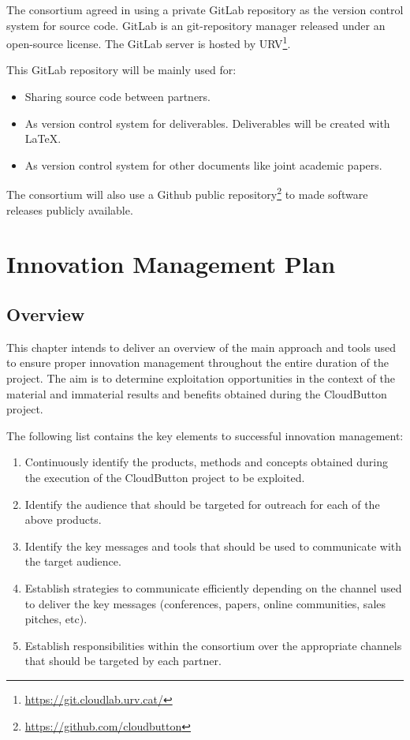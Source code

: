 \documentclass[a4paper,11pt]{article}
\begin{document}
The consortium agreed in using a private GitLab repository as the version control system for source code. GitLab is an git-repository manager released under an open-source license. The GitLab server is hosted by URV\footnote{\url{https://git.cloudlab.urv.cat/}}.

This GitLab repository will be mainly used for:
\begin{itemize}
\item Sharing source code between partners.
\item As version control system for deliverables. Deliverables will be created with LaTeX.
\item As version control system for other documents like joint academic papers.
\end{itemize}

The consortium will also use a Github public repository\footnote{\url{https://github.com/cloudbutton}} to made software releases publicly available.


\newpage

\section{Innovation Management Plan}

\subsection{Overview}

This chapter intends to deliver an overview of the main approach and tools used to ensure proper innovation management throughout the entire duration of the project. The aim is to determine exploitation opportunities in the context of the material and immaterial results and benefits obtained during the CloudButton project.

The following list contains the key elements to successful innovation management:

\begin{enumerate}
\item Continuously identify the products, methods and concepts obtained during the execution of the CloudButton project to be exploited.
\item Identify the audience that should be targeted for outreach for each of the above products.
\item Identify the key messages and tools that should be used to communicate with the target audience.
\item Establish strategies to communicate efficiently depending on the channel used to deliver the key messages (conferences, papers, online communities, sales pitches, etc).
\item Establish responsibilities within the consortium over the appropriate channels that should be targeted by each partner.
\end{enumerate}
\end{document}
